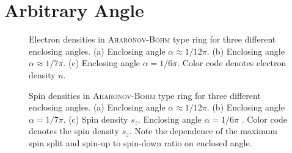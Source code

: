 \chapter{Arbitrary Angle}\label{app:rings}
\begin{figure}[h!]
\hspace{-0.5em}
\hspace{-0.5em}
\caption{Electron densities in \textsc{Aharonov-Bohm} type ring for three different enclosing angles. (a) Enclosing angle $\alpha\approx 1/12 \pi$. (b) Enclosing angle $\alpha\approx 1/7\pi$. (c) Enclosing angle $\alpha=1/6\pi$. Color code denotes electron density $n$.} 
\end{figure}
\begin{figure}[h!]
\hspace{-0.5em}
\hspace{-0.5em}
\caption{Spin densities in \textsc{Aharonov-Bohm} type ring for three different enclosing angles. (a) Enclosing angle $\alpha\approx 1/12 \pi$. (b) Enclosing angle $\alpha=1/7\pi$. (c) Spin density $s_z$. Enclosing angle $\alpha=1/6\pi$ . Color code denotes the spin density $s_z$. Note the dependence of the maximum spin split and spin-up to spin-down ratio on enclosed angle.}
\end{figure}
